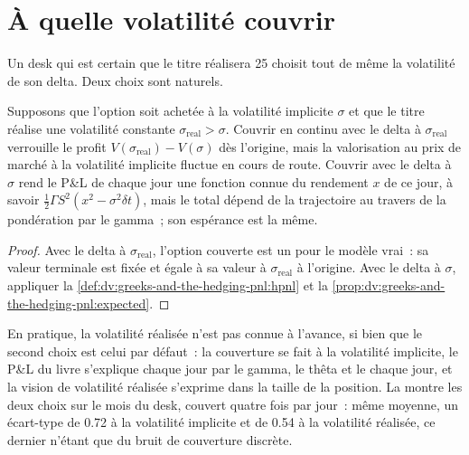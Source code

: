 \section{À quelle volatilité couvrir}

Un desk qui est certain que le titre réalisera 25 choisit tout de même la volatilité de son
delta. Deux choix sont naturels.

\begin{proposition}\label{prop:dv:greeks-and-the-hedging-pnl:which}
Supposons que l'option soit achetée à la volatilité implicite $\sigma$ et que le titre réalise une volatilité constante
$\sigma_{\mathrm{real}}>\sigma$. Couvrir en continu avec le delta à
$\sigma_{\mathrm{real}}$ verrouille le profit $V(\sigma_{\mathrm{real}})-V(\sigma)$ dès
l'origine, mais la valorisation au prix de marché à la volatilité implicite fluctue en cours de route. Couvrir avec le delta à
$\sigma$ rend le P\&L de chaque jour une fonction connue du rendement
$x$ de ce jour, à savoir $\tfrac12\Gamma S^2(x^2-\sigma^2\delta t)$, mais le total dépend de la
trajectoire au travers de la pondération par le gamma~; son espérance est la même.
\end{proposition}
\begin{proof}
Avec le delta à $\sigma_{\mathrm{real}}$, l'option couverte est un
 pour le modèle vrai~: sa valeur terminale est fixée et égale à sa valeur
à $\sigma_{\mathrm{real}}$ à l'origine. Avec le delta à $\sigma$, appliquer
la \cref{def:dv:greeks-and-the-hedging-pnl:hpnl} et la
\cref{prop:dv:greeks-and-the-hedging-pnl:expected}.
\end{proof}

En pratique, la volatilité réalisée n'est pas connue à l'avance, si bien que le second choix
est celui par défaut~: la couverture se fait à la volatilité implicite, le P\&L du livre s'explique chaque jour par le gamma,
le thêta et le  chaque jour, et la vision de volatilité réalisée s'exprime dans la taille
de la position. La  montre les deux choix
sur le mois du desk, couvert quatre fois par jour~: même moyenne, un écart-type de
0.72 à la volatilité implicite et de 0.54 à la volatilité réalisée, ce dernier n'étant que du bruit de couverture discrète.

